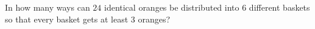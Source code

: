 In how many ways can $24$ identical oranges be distributed into $6$ different baskets so that every basket gets at least $3$ oranges?
